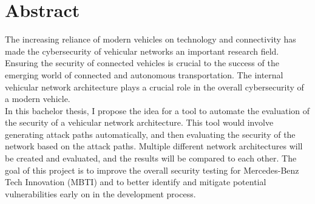 
\chapter*{Abstract}\label{chp:abstract}

The increasing reliance of modern vehicles on technology and connectivity has made the cybersecurity of vehicular networks an important research field. 
Ensuring the security of connected vehicles is crucial to the success of the emerging world of connected and autonomous transportation. 
The internal vehicular network architecture plays a crucial role in the overall cybersecurity of a modern vehicle.\\

In this bachelor thesis, I propose the idea for a tool to automate the evaluation of the security of a vehicular network architecture. 
This tool would involve generating attack paths automatically, and then evaluating the security of the network based on the attack paths.
Multiple different network architectures will be created and evaluated, and the results will be compared to each other.
The goal of this project is to improve the overall security testing for 
Mercedes-Benz Tech Innovation (MBTI) and to better identify and mitigate potential vulnerabilities early on in the development process. 
